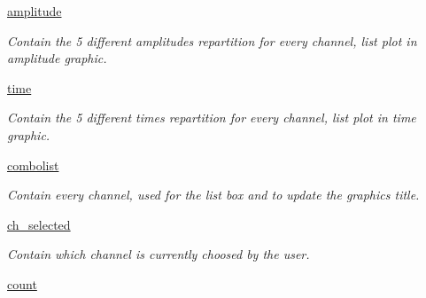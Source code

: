 \begin{DoxyCompactItemize}
\mbox{\label{classreceive_1_1_watchman__graphic__window_ab1f197dab90dfb711e0651df55ca6ae2}} 
\mbox{\hyperlink{classreceive_1_1_watchman__graphic__window_ab1f197dab90dfb711e0651df55ca6ae2}{amplitude}}
\begin{DoxyCompactList}\small\item\em Contain the 5 different amplitudes repartition for every channel, list plot in amplitude graphic. \end{DoxyCompactList}\item 
\mbox{\label{classreceive_1_1_watchman__graphic__window_a128b0a954ab706aa53827af0f36087b0}} 
\mbox{\hyperlink{classreceive_1_1_watchman__graphic__window_a128b0a954ab706aa53827af0f36087b0}{time}}
\begin{DoxyCompactList}\small\item\em Contain the 5 different times repartition for every channel, list plot in time graphic. \end{DoxyCompactList}\item 
\mbox{\label{classreceive_1_1_watchman__graphic__window_a82b71bdb82baf98c78c58a2321fdd9f0}} 
\mbox{\hyperlink{classreceive_1_1_watchman__graphic__window_a82b71bdb82baf98c78c58a2321fdd9f0}{combolist}}
\begin{DoxyCompactList}\small\item\em Contain every channel, used for the list box and to update the graphic\textquotesingle{}s title. \end{DoxyCompactList}\item 
\mbox{\label{classreceive_1_1_watchman__graphic__window_ae0ab5cfbc652e296567ea3fceaa4653b}} 
\mbox{\hyperlink{classreceive_1_1_watchman__graphic__window_ae0ab5cfbc652e296567ea3fceaa4653b}{ch\+\_\+selected}}
\begin{DoxyCompactList}\small\item\em Contain which channel is currently choosed by the user. \end{DoxyCompactList}\item 
\mbox{\label{classreceive_1_1_watchman__graphic__window_a1a1387a82c47d58d4e1df0a37231b56a}} 
\mbox{\hyperlink{classreceive_1_1_watchman__graphic__window_a1a1387a82c47d58d4e1df0a37231b56a}{count}}

\end{DoxyCompactItemize}
